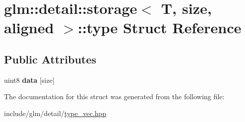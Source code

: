 \hypertarget{structglm_1_1detail_1_1storage_1_1type}{}\section{glm\+:\+:detail\+:\+:storage$<$ T, size, aligned $>$\+:\+:type Struct Reference}
\label{structglm_1_1detail_1_1storage_1_1type}
\subsection*{Public Attributes}
\begin{DoxyCompactItemize}
\item 
\mbox{\label{structglm_1_1detail_1_1storage_1_1type_ab44756dae5eb9194e4e941c91ce9f257}} 
uint8 {\bfseries data} \mbox{[}size\mbox{]}
\end{DoxyCompactItemize}


The documentation for this struct was generated from the following file\+:\begin{DoxyCompactItemize}
\item 
include/glm/detail/\hyperlink{type__vec_8hpp}{type\+\_\+vec.\+hpp}\end{DoxyCompactItemize}

